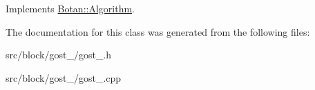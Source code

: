 Implements \hyperlink{classBotan_1_1Algorithm_a42d3ee39e051eba01ecace201fe1e6fd}{Botan\-::\-Algorithm}.



The documentation for this class was generated from the following files\-:\begin{DoxyCompactItemize}
\item 
src/block/gost\-\_/gost\-\_.\-h\item 
src/block/gost\-\_/gost\-\_.\-cpp\end{DoxyCompactItemize}
